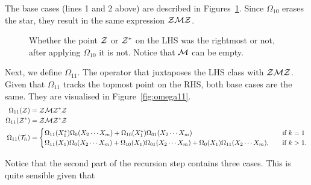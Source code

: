 \documentclass[12pt, a4paper, twoside]{report}
\begin{document}
The base cases (lines 1 and 2 above) are described in Figures~\ref{fig:omega_10}. Since $\Omega_{10}$ erases the star, they result in the same expression $\mathcal{Z}\mathcal{M}\mathcal{Z}$.

\begin{figure}[ht]
    \centering
    \caption{Whether the point $\mathcal{Z}$ or $\mathcal{Z}^*$ on the LHS was the rightmost or not, after applying $\Omega_{10}$ it is not. Notice that $\mathcal{M}$ can be empty.}
    \label{fig:omega_10}
\end{figure}
Next, we define $\Omega_{11}$. The operator that juxtaposes the LHS class with $\mathcal{Z}\mathcal{M}\mathcal{Z}$. Given that $\Omega_{11}$ tracks the topmost point on the RHS, both base cases are the same. They are visualised in Figure~\ref{fig:omega11}.
\begin{align}
  \begin{aligned}
  \Omega_{11}(\mathcal{Z}) &= \mathcal{Z}\mathcal{M}\mathcal{Z}^*\mathcal{Z}\\
  \Omega_{11}(\mathcal{Z}^*) &= \mathcal{Z}\mathcal{M}\mathcal{Z}^*\mathcal{Z}\\
  \Omega_{11}(\mathcal{T}_h) &=
                      \begin{cases}
                        \Omega_{11}(X_1^*)\Omega_0(X_2\cdots X_m)+\Omega_{10}(X_1^*)\Omega_{01}(X_2\cdots X_m) \quad &\text{if $k = 1$}\\
                        \Omega_{11}(X_1)\Omega_0(X_2\cdots X_m) + \Omega_{10}(X_1)\Omega_{01}(X_2\cdots X_m) + \Omega_0(X_1)\Omega_{11}(X_2\cdots X_m),\quad &\text{if $k>1$.}
                      \end{cases}
                    \end{aligned}
\label{eq:omega11Cstar}
\end{align}

Notice that the second part of the recursion step contains three cases. This is quite sensible given that 
\end{document}
